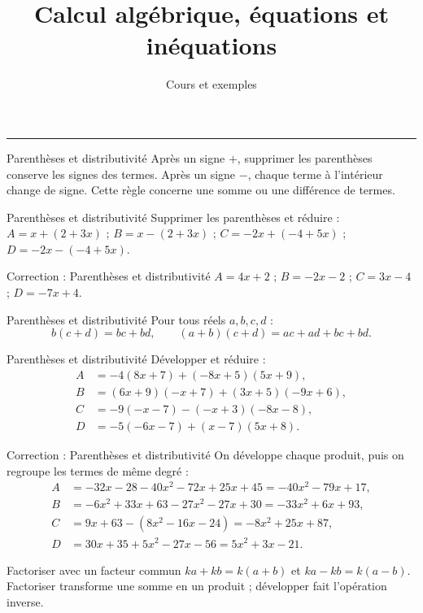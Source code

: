\documentclass[aspectratio=169,10pt]{beamer}
\title{Calcul algébrique, équations et inéquations}
\subtitle{Cours et exemples}
\date{}
\author{}
\begin{document}
\begin{frame}[plain]
\vfill
{\inserttitle\par}
\medskip
{\insertsubtitle\par}
\medskip
{\rule{\textwidth}{.5pt}}
\vfill
\end{frame}
\begin{frame}{Parenthèses et distributivité}
Après un signe \(+\), supprimer les parenthèses conserve les signes des termes. Après un signe \(-\), chaque terme à l'intérieur change de signe. Cette règle concerne une somme ou une différence de termes.
\end{frame}
\begin{frame}{Parenthèses et distributivité}
Supprimer les parenthèses et réduire : \(A=x+(2+3x)\) ; \(B=x-(2+3x)\) ; \(C=-2x+(-4+5x)\) ; \(D=-2x-(-4+5x)\).
\end{frame}
\begin{frame}{Correction : Parenthèses et distributivité}
\(A=4x+2\) ; \(B=-2x-2\) ; \(C=3x-4\) ; \(D=-7x+4\).
\end{frame}
\begin{frame}{Parenthèses et distributivité}
Pour tous réels \(a,b,c,d\) :
\[b(c+d)=bc+bd,\qquad(a+b)(c+d)=ac+ad+bc+bd.\]
\end{frame}
\begin{frame}{Parenthèses et distributivité}
Développer et réduire :
\[\begin{aligned}
A&=-4(8x+7)+(-8x+5)(5x+9),\\
B&=(6x+9)(-x+7)+(3x+5)(-9x+6),\\
C&=-9(-x-7)-(-x+3)(-8x-8),\\
D&=-5(-6x-7)+(x-7)(5x+8).
\end{aligned}\]
\end{frame}
\begin{frame}{Correction : Parenthèses et distributivité}
On développe chaque produit, puis on regroupe les termes de même degré :
\[\begin{aligned}
A&=-32x-28-40x^2-72x+25x+45=-40x^2-79x+17,\\
B&=-6x^2+33x+63-27x^2-27x+30=-33x^2+6x+93,\\
C&=9x+63-(8x^2-16x-24)=-8x^2+25x+87,\\
D&=30x+35+5x^2-27x-56=5x^2+3x-21.
\end{aligned}\]
\end{frame}
\begin{frame}{Factoriser avec un facteur commun}
\(ka+kb=k(a+b)\) et \(ka-kb=k(a-b)\). Factoriser transforme une somme en un produit ; développer fait l'opération inverse.
\end{frame}
\end{document}
